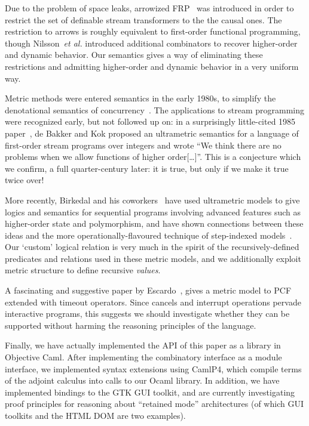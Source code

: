 \documentclass[nocopyrightspace,preprint]{sigplanconf}
\begin{document}
Due to the problem of space leaks, arrowized FRP~\cite{arrowized-frp}
was introduced in order to restrict the set of definable stream
transformers to the the causal ones. The restriction to arrows is
roughly equivalent to first-order functional programming, though
Nilsson~\emph{et al.}  introduced additional combinators to recover
higher-order and dynamic behavior. Our semantics gives a way of
eliminating these restrictions and admitting higher-order and dynamic
behavior in a very uniform way.


Metric methods were entered semantics in the early 1980s, to simplify
the denotational semantics of
concurrency~\cite{concurrency-semantics}. The applications to stream
programming were recognized early, but not followed up on: in a
surprisingly little-cited 1985 paper~\cite{metric-dataflow}, de Bakker
and Kok proposed an ultrametric semantics for a language of
first-order stream programs over integers and wrote ``We think there
are no problems when we allow functions of higher order[\ldots]''.
This is a conjecture which we confirm, a full quarter-century later:
it is true, but only if we make it true twice over!

More recently, Birkedal and his coworkers~\cite{birkedal-ultrametrics}
have used ultrametric models to give logics and semantics for
sequential programs involving advanced features such as higher-order
state and polymorphism, and have shown connections between these
ideas and the more operationally-flavoured technique of step-indexed
models~\cite{appel-mcallester}. Our `custom' logical relation is very much in the spirit of the recursively-defined predicates and relations used in these metric models, and we additionally exploit metric structure to define recursive \emph{values}.

A fascinating and suggestive paper by Escardo~\cite{escardo-metric},
gives a metric model to PCF extended with timeout operators. Since
cancels and interrupt operations pervade interactive programs, this
suggests we should investigate whether they can be supported without
harming the reasoning principles of the language.

Finally, we have actually implemented the API of this paper as a
library in Objective Caml. After implementing the combinatory
interface as a module interface, we implemented syntax extensions
using CamlP4, which compile terms of the adjoint calculus into calls
to our Ocaml library. In addition, we have implemented bindings to the
GTK GUI toolkit, and are currently investigating proof principles
for reasoning about ``retained mode'' architectures (of
which GUI toolkits and the HTML DOM are two examples). 








\end{document}
